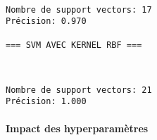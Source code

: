 \documentclass[11pt]{article}
\begin{document}
    \begin{center}
    \end{center}
    { \hspace*{\fill} \\}
    
    \begin{Verbatim}[commandchars=\\\{\}]
Nombre de support vectors: 17
Précision: 0.970

=== SVM AVEC KERNEL RBF ===
    \end{Verbatim}

    \begin{center}
    \end{center}
    { \hspace*{\fill} \\}
    
    \begin{Verbatim}[commandchars=\\\{\}]
Nombre de support vectors: 21
Précision: 1.000
    \end{Verbatim}

    \paragraph{Impact des
hyperparamètres}\label{impact-des-hyperparamuxe8tres}
\end{document}
